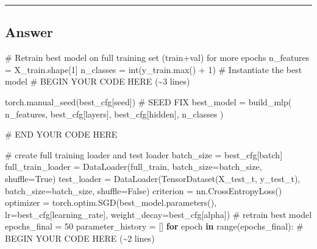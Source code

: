\documentclass[
  letterpaper,
  DIV=11,
  numbers=noendperiod]{scrartcl}
\newenvironment{Shaded}{\begin{snugshade}}{\end{snugshade}}
\newcommand{\BuiltInTok}[1]{\textcolor[rgb]{0.00,0.23,0.31}{#1}}
\newcommand{\CommentTok}[1]{\textcolor[rgb]{0.37,0.37,0.37}{#1}}
\newcommand{\ControlFlowTok}[1]{\textcolor[rgb]{0.00,0.23,0.31}{\textbf{#1}}}
\newcommand{\DecValTok}[1]{\textcolor[rgb]{0.68,0.00,0.00}{#1}}
\newcommand{\KeywordTok}[1]{\textcolor[rgb]{0.00,0.23,0.31}{\textbf{#1}}}
\newcommand{\NormalTok}[1]{\textcolor[rgb]{0.00,0.23,0.31}{#1}}
\newcommand{\OperatorTok}[1]{\textcolor[rgb]{0.37,0.37,0.37}{#1}}
\newcommand{\RegionMarkerTok}[1]{\textcolor[rgb]{0.00,0.23,0.31}{#1}}
\newcommand{\StringTok}[1]{\textcolor[rgb]{0.13,0.47,0.30}{#1}}
\newcommand{\VariableTok}[1]{\textcolor[rgb]{0.07,0.07,0.07}{#1}}
\begin{document}
\begin{center}\rule{0.5\linewidth}{0.5pt}\end{center}

\subsection{Answer}\label{answer-5}

\begin{Shaded}
\begin{Highlighting}[]

\CommentTok{\# Retrain best model on full training set (train+val) for more epochs}
\NormalTok{n\_features }\OperatorTok{=}\NormalTok{ X\_train.shape[}\DecValTok{1}\NormalTok{]}
\NormalTok{n\_classes }\OperatorTok{=} \BuiltInTok{int}\NormalTok{(y\_train.}\BuiltInTok{max}\NormalTok{() }\OperatorTok{+} \DecValTok{1}\NormalTok{)}
\CommentTok{\# Instantiate the best model}
\CommentTok{\# }\RegionMarkerTok{BEGIN}\CommentTok{ YOUR CODE HERE (\textasciitilde{}3 lines)}


\NormalTok{torch.manual\_seed(best\_cfg[}\StringTok{\textquotesingle{}seed\textquotesingle{}}\NormalTok{]) }\CommentTok{\# SEED FIX}
\NormalTok{best\_model }\OperatorTok{=}\NormalTok{ build\_mlp(}
\NormalTok{    n\_features,}
\NormalTok{    best\_cfg[}\StringTok{\textquotesingle{}layers\textquotesingle{}}\NormalTok{],}
\NormalTok{    best\_cfg[}\StringTok{\textquotesingle{}hidden\textquotesingle{}}\NormalTok{],}
\NormalTok{    n\_classes}
\NormalTok{)}



\CommentTok{\# }\RegionMarkerTok{END}\CommentTok{ YOUR CODE HERE}

\CommentTok{\# create full training loader and test loader}
\NormalTok{batch\_size }\OperatorTok{=}\NormalTok{ best\_cfg[}\StringTok{\textquotesingle{}batch\textquotesingle{}}\NormalTok{]}
\NormalTok{full\_train\_loader }\OperatorTok{=}\NormalTok{ DataLoader(full\_train, batch\_size}\OperatorTok{=}\NormalTok{batch\_size, shuffle}\OperatorTok{=}\VariableTok{True}\NormalTok{)}
\NormalTok{test\_loader }\OperatorTok{=}\NormalTok{ DataLoader(TensorDataset(X\_test\_t, y\_test\_t), batch\_size}\OperatorTok{=}\NormalTok{batch\_size, shuffle}\OperatorTok{=}\VariableTok{False}\NormalTok{)}
\NormalTok{criterion }\OperatorTok{=}\NormalTok{ nn.CrossEntropyLoss()}
\NormalTok{optimizer }\OperatorTok{=}\NormalTok{ torch.optim.SGD(best\_model.parameters(),}
\NormalTok{                          lr}\OperatorTok{=}\NormalTok{best\_cfg[}\StringTok{\textquotesingle{}learning\_rate\textquotesingle{}}\NormalTok{],}
\NormalTok{                          weight\_decay}\OperatorTok{=}\NormalTok{best\_cfg[}\StringTok{\textquotesingle{}alpha\textquotesingle{}}\NormalTok{])}
\CommentTok{\# retrain best model}
\NormalTok{epochs\_final }\OperatorTok{=} \DecValTok{50}
\NormalTok{parameter\_history }\OperatorTok{=}\NormalTok{ []}
\ControlFlowTok{for}\NormalTok{ epoch }\KeywordTok{in} \BuiltInTok{range}\NormalTok{(epochs\_final):}
    \CommentTok{\# }\RegionMarkerTok{BEGIN}\CommentTok{ YOUR CODE HERE (\textasciitilde{}2 lines)}


\end{Highlighting}
\end{Shaded}
\end{document}
